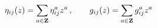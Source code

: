 \begin{equation}
\eta_{ij}(z)=\sum_{a\in {\bf Z}}\eta^a_{ij} z^a\,, \qquad
g_{ij}(z)=\sum_{a\in {\bf Z}} g^a_{ij} z^a
\label{Loran}
\end{equation}

